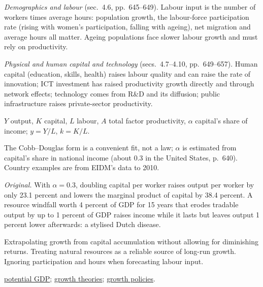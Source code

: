 \begin{qfdefinition}
\emph{Demographics and labour} (sec.~4.6, pp.~645--649). Labour input is the number of workers times average hours: population growth, the labour-force participation rate (rising with women's participation, falling with ageing), net migration and average hours all matter. Ageing populations face slower labour growth and must rely on productivity.

\emph{Physical and human capital and technology} (secs.~4.7--4.10, pp.~649--657). Human capital (education, skills, health) raises labour quality and can raise the rate of innovation; ICT investment has raised productivity growth directly and through network effects; technology comes from R\&D and its diffusion; public infrastructure raises private-sector productivity.

 $Y$ output, $K$ capital, $L$ labour, $A$ total factor productivity, $\alpha$ capital's share of income; $y=Y/L$, $k=K/L$.

 The Cobb--Douglas form is a convenient fit, not a law; $\alpha$ is estimated from capital's share in national income (about 0.3 in the United States, p.~640). Country examples are from EIDM's data to 2010.

 \emph{Original.} With $\alpha=0.3$, doubling capital per worker raises output per worker by only 23.1 percent and lowers the marginal product of capital by 38.4 percent. A resource windfall worth 4 percent of GDP for 15 years that erodes tradable output by up to 1 percent of GDP raises income while it lasts but leaves output 1 percent lower afterwards: a stylised Dutch disease.

 Extrapolating growth from capital accumulation without allowing for diminishing returns. Treating natural resources as a reliable source of long-run growth. Ignoring participation and hours when forecasting labour input.

 \hyperref[meth:potential-gdp-growth-accounting]{potential GDP}; \hyperref[mod:growth-theories-convergence]{growth theories}; \hyperref[def:growth-policies-technology-trade]{growth policies}.

\end{qfdefinition}

